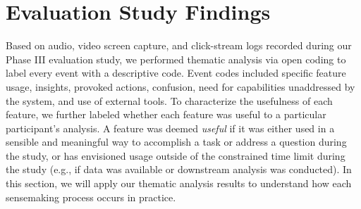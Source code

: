  \section{Evaluation Study Findings\label{sec:eval_findings}}
 Based on audio, video screen capture,
 and click-stream logs recorded
 during our Phase III evaluation study,
 we performed thematic analysis via open coding to label every event with a descriptive code. Event codes included specific feature usage,
 insights,
 provoked actions, confusion,
 need for capabilities unaddressed
 by the system, and use of external tools. To characterize the usefulness
 of each feature, we further labeled whether each
 feature was useful to a particular participant's analysis.
 A feature was deemed \textit{useful}
 if it was either used in a sensible
 and meaningful way to accomplish a task or address a question during the study,
 or has envisioned usage outside of the constrained
 time limit during the study
 (e.g., if data was available or downstream analysis was conducted).
 In this section, we will apply our thematic analysis results to understand how each sensemaking process occurs in practice.%
